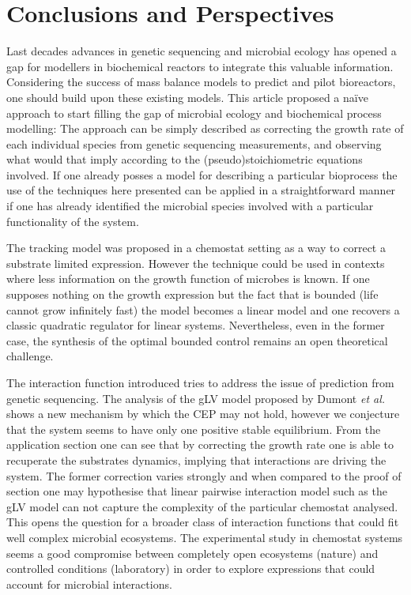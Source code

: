 \documentclass[3p,times]{elsarticle}
\begin{document}
\clearpage
\section{Conclusions and Perspectives}

Last decades advances in genetic sequencing and microbial ecology has opened a gap for modellers in biochemical reactors to integrate this valuable information. Considering the success of mass balance models to predict and pilot bioreactors, one should build upon these existing models. This article proposed a naïve approach to start filling the gap of microbial ecology and biochemical process modelling: The approach can be simply described as correcting the growth rate of each individual species from genetic sequencing measurements, and observing what would that imply according to the (pseudo)stoichiometric equations involved. If one already posses a model for describing a particular bioprocess the use of the techniques here presented can be applied in a straightforward manner if one has already identified the microbial species involved with a particular functionality of the system.

The tracking model was proposed  in a chemostat setting as a way to correct a substrate limited expression. However the technique could be used in contexts where less information on the growth function of microbes is known. If one supposes nothing on the growth expression but the fact that is bounded (life cannot grow infinitely fast) the model becomes a linear model and one recovers a classic quadratic regulator for linear systems. Nevertheless, even in the former case, the synthesis of the optimal bounded control remains an open theoretical challenge.

The interaction function introduced tries to address the issue of prediction from genetic sequencing. The analysis of the gLV model proposed by Dumont \textit{et al.} \cite{Dumont2016} shows a new mechanism by which the CEP may not hold, however we conjecture that the system seems to have only one positive stable equilibrium. From the application section one can see that by correcting the growth rate one is able to recuperate the substrates dynamics, implying that interactions are driving the system. The former correction varies strongly and when compared to the proof of section one may hypothesise that linear pairwise interaction model such as the gLV model can not capture the complexity of the particular chemostat analysed. This opens the question for a broader class of interaction functions that could fit well complex microbial ecosystems. The experimental study in chemostat systems seems a good compromise between completely open ecosystems (nature) and controlled conditions (laboratory) in order to explore expressions that could account for microbial interactions.
\end{document}
